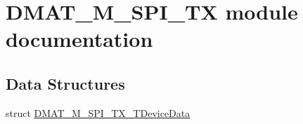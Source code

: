 \hypertarget{group___d_m_a_t___m___s_p_i___t_x__module}{\section{D\-M\-A\-T\-\_\-\-M\-\_\-\-S\-P\-I\-\_\-\-T\-X module documentation}
\label{group___d_m_a_t___m___s_p_i___t_x__module}
}
\subsection*{Data Structures}
\begin{DoxyCompactItemize}
\item 
struct \hyperlink{struct_d_m_a_t___m___s_p_i___t_x___t_device_data}{D\-M\-A\-T\-\_\-\-M\-\_\-\-S\-P\-I\-\_\-\-T\-X\-\_\-\-T\-Device\-Data}
\end{DoxyCompactItemize}
